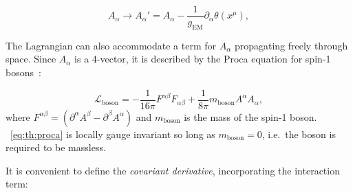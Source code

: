\begin{equation}
\label{eq:th:photon_gauge}
A_{\alpha} \rightarrow  A_{\alpha}' =  A_{\alpha} - \frac{1}{g_{\textrm{EM}}} \partial_{\alpha} \theta(x^{\mu}),
\end{equation}


The Lagrangian can also accommodate a term for $A_{\alpha}$ propagating freely through space. Since $A_{\alpha}$ is a 4-vector, it is described by the Proca equation for spin-1 bosons~\cite{griffiths2008introduction}:

\begin{equation}
\label{eq:th:proca}
\mathcal{L}_{\textrm{boson}} = -\frac{1}{16\pi} F^{\alpha\beta}F_{\alpha\beta} + \frac{1}{8\pi} m_{\textrm{boson}} A^{\alpha} A_{\alpha},
\end{equation}
where $F^{\alpha \beta} =(\partial^{\alpha} A^{\beta} - \partial^{\beta} A^{\alpha})$ and $m_{\textrm{boson}}$ is the mass of the spin-1 boson. 
\Eq~\ref{eq:th:proca} is locally gauge invariant so long as $m_{\textrm{boson}}=0$, i.e.~the boson is required to be massless.


It is convenient to define the \emph{covariant derivative}, incorporating the interaction term:

